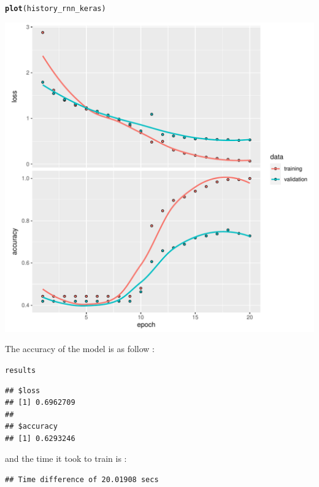 \documentclass[letter,8pt]{article}\usepackage[]{graphicx}\usepackage[]{color}
\makeatletter
\newcommand{\hlstd}[1]{\textcolor[rgb]{0.345,0.345,0.345}{#1}}%
\newcommand{\hlkwd}[1]{\textcolor[rgb]{0.737,0.353,0.396}{\textbf{#1}}}%
\newenvironment{kframe}{%
 \def\at@end@of@kframe{}%
 \ifinner\ifhmode%
  \def\at@end@of@kframe{\end{minipage}}%
  \begin{minipage}{\columnwidth}%
 \fi\fi%
 \def\FrameCommand##1{\hskip\@totalleftmargin \hskip-\fboxsep
 \colorbox{shadecolor}{##1}\hskip-\fboxsep
     \hskip-\linewidth \hskip-\@totalleftmargin \hskip\columnwidth}%
 \MakeFramed {\advance\hsize-\width
   \@totalleftmargin\z@ \linewidth\hsize
   \@setminipage}}%
 {\par\unskip\endMakeFramed%
 \at@end@of@kframe}
\newenvironment{knitrout}{}{} %
\makeatother
\begin{document}
\begin{knitrout}
\color{fgcolor}\begin{kframe}
\begin{alltt}
\hlkwd{plot}\hlstd{(history_rnn_keras)}
\end{alltt}


{\ttfamily\noindent\itshape{}}\end{kframe}
\includegraphics[width=5.5in]{figure/unnamed-chunk-51-1} 

\end{knitrout}
The accuracy of the model is as follow :
\begin{knitrout}
\color{fgcolor}\begin{kframe}
\begin{alltt}
\hlstd{results}
\end{alltt}
\begin{verbatim}
## $loss
## [1] 0.6962709
## 
## $accuracy
## [1] 0.6293246
\end{verbatim}
\end{kframe}
\end{knitrout}
and the time it took to train is :
\begin{knitrout}
\color{fgcolor}\begin{kframe}
\begin{verbatim}
## Time difference of 20.01908 secs
\end{verbatim}
\end{kframe}
\end{knitrout}
\end{document}
